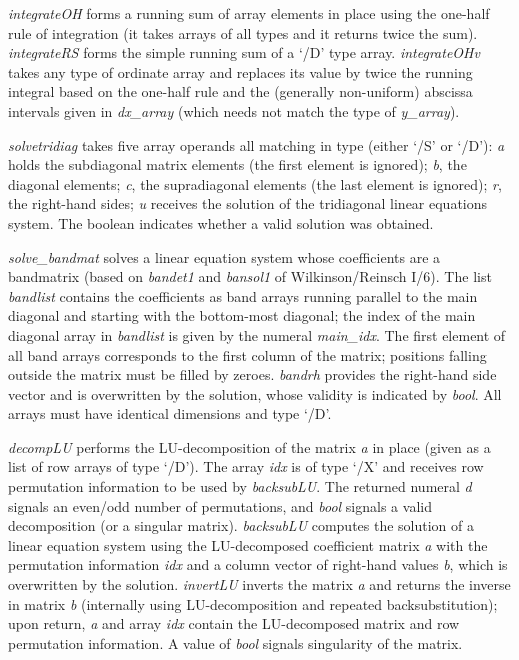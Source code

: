 \emph{integrateOH} forms a running sum of array elements in place using the one-half rule of integration (it takes arrays of all types and it returns twice the sum). \emph{integrateRS} forms the simple running sum of a `/D' type array. \emph{integrateOHv} takes any type of ordinate array and replaces its value by twice the running integral based on the one-half rule and the (generally non-uniform) abscissa intervals given in \emph{dx\_array} (which needs not match the type of \emph{y\_array}).

\emph{solvetridiag} takes five array operands all matching in type (either `/S' or `/D'): \emph{a} holds the subdiagonal matrix elements (the first element is ignored); \emph{b}, the diagonal elements; \emph{c}, the supradiagonal elements (the last element is ignored); \emph{r}, the right-hand sides; \emph{u} receives the solution of the tridiagonal linear equations system. The boolean indicates whether a valid solution was obtained.

\emph{solve\_bandmat} solves a linear equation system whose coefficients are a bandmatrix (based on \emph{bandet1} and \emph{bansol1} of Wilkinson/Reinsch I/6). The list \emph{bandlist} contains the coefficients as band arrays running parallel to the main diagonal and starting with the bottom-most diagonal; the index of the main diagonal array in \emph{bandlist} is given by the numeral \emph{main\_idx}. The first element of all band arrays corresponds to the first column of the matrix; positions falling outside the matrix must be filled by zeroes. \emph{bandrh} provides the right-hand side vector and is overwritten by the solution, whose validity is indicated by \emph{bool}. All arrays must have identical dimensions and type `/D'.

\emph{decompLU} performs the LU-decomposition of the matrix \emph{a}
in place (given as a list of row arrays of type `/D'). The array
\emph{idx} is of type `/X' and receives row permutation information to
be used by \emph{backsubLU}. The returned numeral \emph{d} signals an
even/odd number of permutations, and \emph{bool} signals a valid
decomposition (or a singular matrix). \emph{backsubLU} computes the
solution of a linear equation system using the LU-decomposed
coefficient matrix \emph{a} with the permutation information
\emph{idx} and a column vector of right-hand values \emph{b}, which is
overwritten by the solution. \emph{invertLU} inverts the matrix
\emph{a} and returns the inverse in matrix \emph{b} (internally using
LU-decomposition and repeated backsubstitution); upon return, \emph{a}
and array \emph{idx} contain the LU-decomposed matrix and row
permutation information. A  value of \emph{bool} signals
singularity of the matrix.

